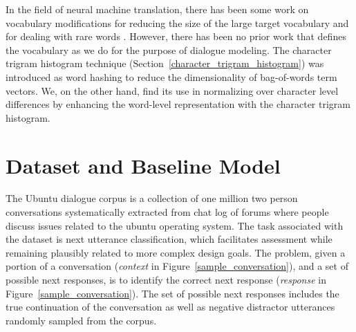 \documentclass[11pt]{report}
\begin{document}
In the field of neural machine translation, there has been some work on vocabulary modifications for reducing the size of the large target vocabulary \cite{JeanCMB15, mi2016vocabulary} and for dealing with rare words \cite{luong2014addressing, sennrich2015neural}. 
However, there has been no prior work that defines the vocabulary as we do for the purpose of dialogue modeling.
The character trigram histogram technique (Section~\ref{character_trigram_histogram}) was introduced as word hashing \cite{huang2013learning} to reduce the dimensionality of bag-of-words term vectors. We, on the other hand, find its use in normalizing over character level differences by enhancing the word-level representation with the character trigram histogram. 

\section{Dataset and Baseline Model}\label{dataset_baseline}

The Ubuntu dialogue corpus is a collection of one million two person conversations systematically extracted from chat log of forums where people discuss issues related to the ubuntu operating system. The task associated with the dataset is next utterance classification, which facilitates assessment while remaining plausibly related to more
complex design goals.  The problem, given a portion of a conversation (\textit{context} in Figure~\ref{sample_conversation}), and a set of possible next responses, is to identify the correct next response (\textit{response} in Figure~\ref{sample_conversation}).  The set of possible next responses includes the true continuation of the conversation as well as negative distractor utterances randomly sampled from the corpus.
\end{document}
